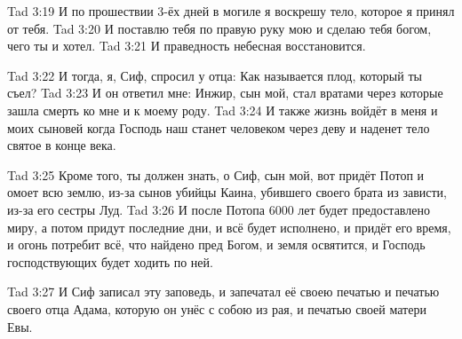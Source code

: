 \vs Tad 3:19
И по прошествии 3-ёх дней в могиле я воскрешу тело, которое я принял
от тебя.
\vs Tad 3:20
И поставлю тебя по правую руку мою и сделаю тебя богом, чего ты и хотел.
\vs Tad 3:21
И праведность небесная восстановится.

\vs Tad 3:22
И тогда, я, Сиф, спросил у отца: Как называется плод, который ты съел?
\vs Tad 3:23
И он ответил мне: Инжир, сын мой, стал вратами через которые зашла смерть
ко мне и к моему роду.
\vs Tad 3:24
И также жизнь войдёт в меня и моих сыновей когда Господь наш станет
человеком через деву и наденет тело святое в конце века.

\vs Tad 3:25
Кроме того, ты должен знать, о Сиф, сын мой,
вот придёт Потоп и омоет всю землю,
из-за сынов убийцы Каина, убившего своего брата из зависти,
из-за его сестры Луд.
\vs Tad 3:26
И после Потопа 6000 лет будет предоставлено миру,
а потом придут последние дни,
и всё будет исполнено, и придёт его время,
и огонь потребит всё, что найдено пред Богом,
и земля освятится,
и Господь господствующих будет ходить по ней.

\vs Tad 3:27
И Сиф записал эту заповедь,
и запечатал её своею печатью
и печатью своего отца Адама,
которую он унёс с собою из рая,
и печатью своей матери Евы.
